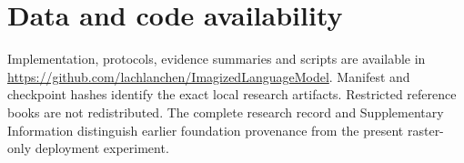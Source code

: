 \balance
\section*{Data and code availability}
Implementation, protocols, evidence summaries and scripts are available in
\url{https://github.com/lachlanchen/ImagizedLanguageModel}. Manifest and
checkpoint hashes identify the exact local research artifacts. Restricted
reference books are not redistributed. The complete research record and
Supplementary Information distinguish earlier foundation provenance from the
present raster-only deployment experiment.


